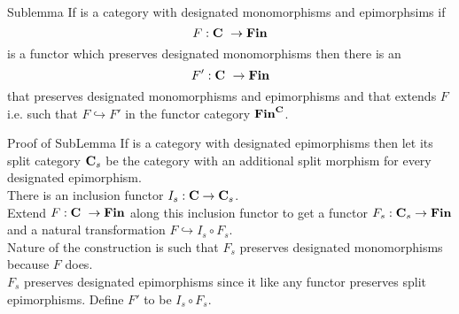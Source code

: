 \newcommand{\mappedrepresentationdiagram}{
\newcommand{\myspacing}{0.25cm}
$
\begin{array}{ c p{0.2cm} c p{0.5cm} c}
\Rnode{Imgf}{Img(D(f))} && \Rnode{b}{D(b)}   &&                   \\[\myspacing]
                        &&                   &&\Rnode{d1}{D(d_1)} \\[\myspacing]
                        &&\Rnode{b1}{D(b_1)} &&                   \\[\myspacing]
                        &&                   &&\Rnode{d2}{D(d_2)} \\[\myspacing]
                        &&\Rnode{b2}{D(b_2)} &&                   \\ %
                        &&\vdots             &&\vdots             \\
                        &&\Rnode{bnp}{d(b_{n-1})} &&           \\[\myspacing]
                        &&                   &&\Rnode{dn}{D(d_n)} \\[\myspacing]
\Rnode{c}{D(c)}  
\end{array}
\begin{arrows}
\ncline{H->}{Imgf}{b}
\ncarr{Imgf}{c}\alabel{H_D}
\ncarr[5]{b}{d1}\alabel{D(q_1)^{-1}}[0.5][-3]
\ncarr{d1}{b1}\blabel{D(h_1)}[0.5][-1]
\ncarr{b1}{d2}\alabel{D(q_2)^{-1}}[0.5][-3]
\ncarr{d2}{b2}\blabel{D(h_2)}[0.5][-1]
\ncarr{bnp}{dn}\alabel{D(q_n)^{-1}}[0.5][-3]
\ncarr[5]{dn}{c}\alabel{D(h_n)}[0.5][-1]
\end{arrows}
$
}

\begin{frame}{Sublemma}
If \catcw is a category with designated monomorphisms and epimorphsims 
if 
 $$F: \textbf{C}\  \rightarrow \textbf{Fin}$$
  is a functor which preserves designated monomorphisms
then there is an 
$$F':\textbf{C}\  \rightarrow \textbf{Fin}$$
that preserves designated monomorphisms and epimorphisms
and that extends $F$ i.e. such that $F \hookrightarrow F'$ in the functor category $\textbf{Fin}^{\textbf{C}}$.
\end{frame}

\begin{frame}{Proof of SubLemma}
If \catcw is a category with designated epimorphisms then let its split category 
$\textbf{C}_s$ be the category \catcw with an additional split morphism for every designated epimorphism.\\
\medskip
There is an inclusion functor $I_s:\textbf{C} \rightarrow \textbf{C}_s$.\\
\medskip
Extend $F:\textbf{C}\  \rightarrow \textbf{Fin}$ along this inclusion functor  to get a functor 
$F_s:\textbf{C}_s \rightarrow \textbf{Fin}$ and a natural transformation $F \hookrightarrow I_s \circ F_s$. \\
\medskip
Nature of the construction is such that $F_s$ preserves designated monomorphisms because $F$ does.\\
\medskip
$F_s$ preserves designated epimorphisms since it like any functor preserves split epimorphisms.
Define $F'$ to be $I_s \circ F_s$.
\end{frame}

